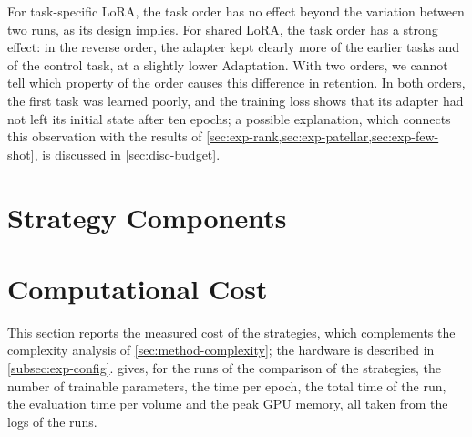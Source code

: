 For task-specific LoRA, the task order has no effect beyond the variation between two runs, as its design implies.
For shared LoRA, the task order has a strong effect: in the reverse order, the adapter kept clearly more of the earlier tasks and of the control task, at a slightly lower Adaptation.
With two orders, we cannot tell which property of the order causes this difference in retention.
In both orders, the first task was learned poorly, and the training loss shows that its adapter had not left its initial state after ten epochs; a possible explanation, which connects this observation with the results of \cref{sec:exp-rank,sec:exp-patellar,sec:exp-few-shot}, is discussed in \cref{sec:disc-budget}.


\section{Strategy Components}
\label{sec:exp-components}

\section{Computational Cost}
\label{sec:exp-compute}
This section reports the measured cost of the strategies, which complements the complexity analysis of \cref{sec:method-complexity}; the hardware is described in \cref{subsec:exp-config}.
 gives, for the runs of the comparison of the strategies, the number of trainable parameters, the time per epoch, the total time of the run, the evaluation time per volume and the peak GPU memory, all taken from the logs of the runs.

\begin{table}[tb]
\centering
\caption[Measured cost of the strategies]{Measured cost of the strategies in the comparison (full training split, original task order, one NVIDIA A100 40\,GB). Trainable param.: parameters set as trainable, in millions; of the 440.03 million of sequential fine-tuning and the distillation-based strategy, 339.29 million receive gradients (\cref{subsec:method-seqft}). Epoch: mean wall-clock time of one training epoch including validation. Wall-clock: total time of all jobs of the run, including the evaluation of the protocol and restarts after the 24-hour limit. Evaluation: median time per test volume, including data loading and text encoding. Peak GPU mem.: maximum over all jobs of the run.}
\label{tab:ch6_compute}

\end{table}

